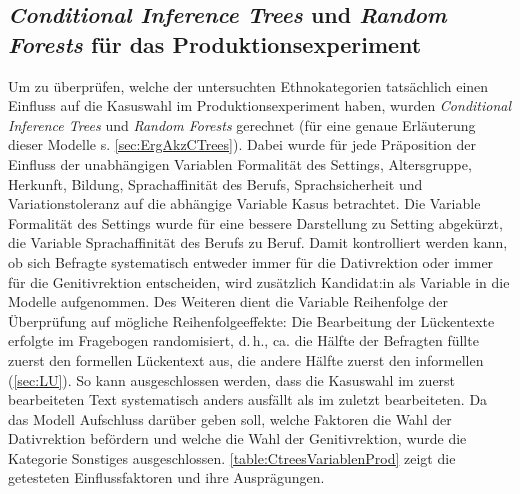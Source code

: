 \subsection{\textit{Conditional Inference Trees} und \textit{Random Forests} für das Produktionsexperiment}
\label{sec:ErgProdCTrees}
Um zu überprüfen, welche der untersuchten Ethnokategorien tatsächlich einen Einfluss auf die Kasuswahl im Produktionsexperiment haben, wurden {\textit{Con\-di\-tion\-al In\-fe\-rence Trees}} und \textit{Random Forests} gerechnet (für eine genaue Erläuterung dieser Modelle s. \autoref{sec:ErgAkzCTrees}). 
Dabei wurde für jede Präposition der Einfluss der unabhängigen Variablen \glqq Formalität des Settings\grqq, \glqq Altersgruppe\grqq, \glqq Herkunft\grqq{}, \glqq Bildung\grqq, \glqq Sprachaffinität des Berufs\grqq, \glqq Sprachsicherheit\grqq{} und \glqq Variationstoleranz\grqq{} auf die abhängige Variable \glqq Kasus\grqq{} betrachtet. 
Die Variable \glqq Formalität des Settings\grqq{} wurde für eine bessere Darstellung zu \glqq Setting\grqq{} abgekürzt, die Variable \glqq Sprachaffinität des Berufs\grqq{} zu \glqq Beruf\grqq{}. 
Damit kontrolliert werden kann, ob sich Befragte systematisch entweder immer für die Dativrektion oder immer für die Genitivrektion entscheiden, wird zusätzlich \glqq Kandidat:in\grqq{} als Variable in die Modelle aufgenommen. 
Des Weiteren dient die Variable \glqq Reihenfolge\grqq{} der Überprüfung auf mögliche Reihenfolgeeffekte: 
Die Bearbeitung der Lückentexte erfolgte im Fragebogen randomisiert, d.\,h., ca. die Hälfte der Befragten füllte zuerst den formellen Lückentext aus, die andere Hälfte zuerst den informellen (\autoref{sec:LU}). 
So kann ausgeschlossen werden, dass die Kasuswahl im zuerst bearbeiteten Text systematisch anders ausfällt als im zuletzt bearbeiteten.          
Da das Modell Aufschluss darüber geben soll, welche Faktoren die Wahl der Dativrektion befördern und welche die Wahl der Genitivrektion, wurde die Kategorie \glqq Sonstiges\grqq{} ausgeschlossen. 
\autoref{table:CtreesVariablenProd} zeigt die getesteten Einflussfaktoren und ihre Ausprägungen. 

